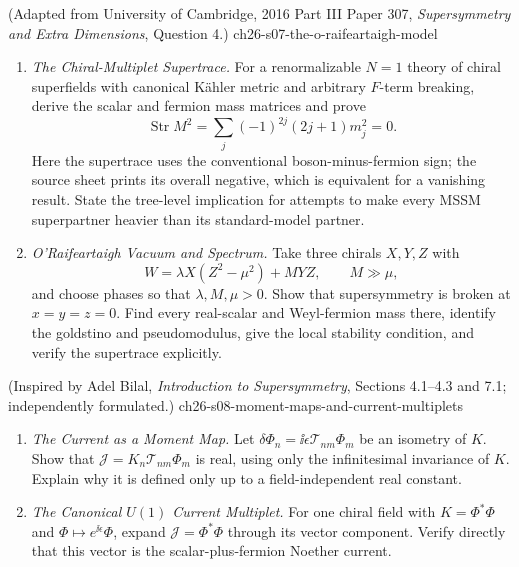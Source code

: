 \begin{enumerate}
    {(Adapted from University of Cambridge, 2016 Part III Paper 307, \emph{Supersymmetry and Extra Dimensions}, Question 4.)}
    {ch26-s07-the-o-raifeartaigh-model}
  \begin{enumerate}
    \item \emph{The Chiral-Multiplet Supertrace.}
    For a renormalizable \(N=1\) theory of chiral superfields with canonical
      Kähler metric and arbitrary \(F\)-term breaking, derive the scalar and
      fermion mass matrices and prove
      \[
        \operatorname{Str}M^2
          =\sum_j(-1)^{2j}(2j+1)m_j^2=0.
      \]
      Here the supertrace uses the conventional boson-minus-fermion sign;
      the source sheet prints its overall negative, which is equivalent for
      a vanishing result.
      State the tree-level implication for attempts to make every MSSM
      superpartner heavier than its standard-model partner.
    \item \emph{O'Raifeartaigh Vacuum and Spectrum.}
    Take three chirals \(X,Y,Z\) with
      \[
        W=\lambda X(Z^2-\mu^2)+MYZ,\qquad M\gg\mu,
      \]
      and choose phases so that \(\lambda,M,\mu>0\).  Show that supersymmetry
      is broken at \(x=y=z=0\).  Find every real-scalar and Weyl-fermion
      mass there, identify the goldstino and pseudomodulus, give the local
      stability condition, and verify the supertrace explicitly.
  \end{enumerate}

    {(Inspired by Adel Bilal, \emph{Introduction to Supersymmetry}, Sections 4.1--4.3 and 7.1; independently formulated.)}
    {ch26-s08-moment-maps-and-current-multiplets}
  \begin{enumerate}
    \item \emph{The Current as a Moment Map.}
    Let \(\delta\Phi_n=\ii\epsilon\mathcal T_{nm}\Phi_m\) be an isometry of
      \(K\).  Show that
      \(\mathcal J=K_n\mathcal T_{nm}\Phi_m\) is real, using only the
      infinitesimal invariance of \(K\).  Explain why it is defined only up to a
      field-independent real constant.
    \item \emph{The Canonical \(U(1)\) Current Multiplet.}
    For one chiral field with \(K=\Phi^*\Phi\) and
      \(\Phi\mapsto e^{\ii\epsilon}\Phi\), expand
      \(\mathcal J=\Phi^*\Phi\) through its vector component.  Verify directly
      that this vector is the scalar-plus-fermion Noether current.
  \end{enumerate}


\end{enumerate}
